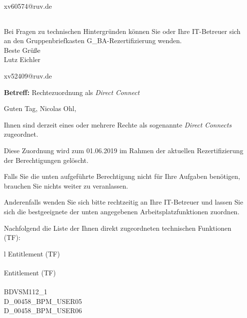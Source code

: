 \documentclass[a4paper,landscape,12pt]{letter}
\begin{document}
\begin{letter}{xv60574@ruv.de\hfill \break}
\begin{tiny}
\begin{longtable}{|p{35mm}|p{15mm}|p{25mm}|p{10mm}|p{40mm}|p{50mm}|p{50mm}|}
\hline
		\end{longtable}
		\end{tiny}
	
\begin{minipage}{\textwidth}
			Bei Fragen zu technischen Hintergründen können Sie 
			oder Ihre IT-Betreuer sich an den Gruppenbriefkasten 
			G\_BA-Rezertifizierung
			wenden.\\
			\linebreak
			Beste Grüße\\
			Lutz Eichler
	\end{minipage}
	\end{letter}
	
\begin{letter}{xv52409@ruv.de\hfill \break}
\begin{normalsize}
	\opening{\textbf{Betreff:} Rechtezuordnung als \emph{Direct Connect}}
	\begin{normalsize} \hfill
	\end{normalsize}

	\begin{normalsize}
		Guten Tag, 
	Nicolas Ohl, \hfill \break
	\end{normalsize}
	\end{normalsize}
	
\begin{normalsize}
	Ihnen sind derzeit eines oder mehrere Rechte als sogenannte \emph{Direct Connects} zugeordnet.
	
	Diese Zuordnung wird zum 01.06.2019 im Rahmen der aktuellen Rezertifizierung der Berechtigungen gelöscht.
	
	Falls Sie die unten aufgeführte Berechtigung nicht für Ihre Aufgaben benötigen, 
	brauchen Sie nichts weiter zu veranlassen.
	
	Anderenfalls wenden Sie sich bitte rechtzeitig an Ihre IT-Betreuer 
	und lassen Sie sich die bestgeeignete der unten angegebenen Arbeitsplatzfunktionen zuordnen.
	\end{normalsize}
	
\begin{normalsize}
	Nachfolgend die Liste der Ihnen direkt zugeordneten technischen Funktionen (TF):

	\begin{longtable}{l}
		Entitlement (TF) \\ \hline
		\endfirsthead
		\\\hline
		Entitlement (TF) \\ \hline
		\endhead %
		\multicolumn{1}{r@{}}{Fortsetzung \ldots}\\
		\endfoot
		\hline
		\endlastfoot
	BDVSM112\_1\\D\_00458\_BPM\_USER05\\D\_00458\_BPM\_USER06\\
	\end{longtable}
	\end{normalsize}
	

\end{letter}
\end{document}
